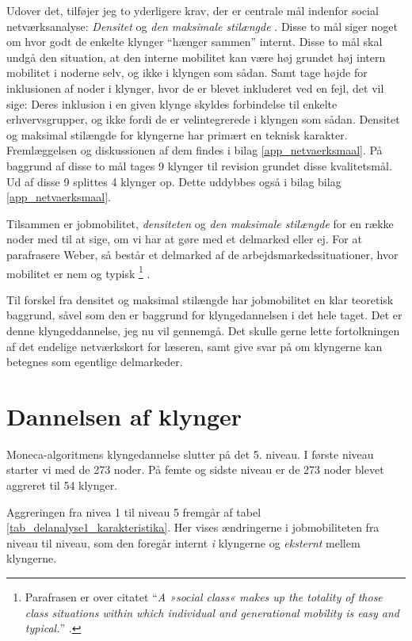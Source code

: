 Udover det, tilføjer jeg to yderligere krav, der er centrale mål indenfor social netværksanalyse: \emph{Densitet} og \emph{den maksimale stilængde} \parencite[68f]{Scott2000}. Disse to mål siger noget om hvor godt de enkelte klynger “hænger sammen” internt. Disse to mål skal undgå den situation, at den interne mobilitet kan være høj grundet høj intern mobilitet i noderne selv, og ikke i klyngen som sådan. Samt tage højde for inklusionen af noder i klynger, hvor de er blevet inkluderet ved en fejl, det vil sige: Deres inklusion i en given klynge skyldes forbindelse til enkelte erhvervsgrupper, og ikke fordi de er velintegrerede i klyngen som sådan. Densitet og maksimal stilængde for klyngerne har primært en teknisk karakter. Fremlæggelsen og diskussionen af dem findes i bilag \ref{app_netvaerksmaal}. På baggrund af disse to mål tages 9 klynger til revision grundet disse kvalitetsmål. Ud af disse 9 splittes 4 klynger op. Dette uddybbes også i bilag bilag \ref{app_netvaerksmaal}. 

Tilsammen er jobmobilitet, \emph{densiteten} og \emph{den maksimale stilængde} for en række noder med til at sige, om vi har at gøre med et delmarked eller ej. For at parafrasere Weber, så består et delmarked af de arbejdsmarkedssituationer, hvor mobilitet er nem og typisk 
%
\footnote{Parafrasen er over citatet “\emph{A »social class« makes up the totality of those class situations within which individual and generational mobility is easy and typical.}” \parencite[302]{Weber1978}.}%
%
\parencite[302]{Weber1978}. 

Til forskel fra densitet og maksimal stilængde har jobmobilitet en klar teoretisk baggrund, såvel som den er baggrund for klyngedannelsen i det hele taget. Det er denne klyngeddannelse, jeg nu vil gennemgå. Det skulle gerne lette fortolkningen af det endelige netværkskort for læseren, samt give svar på om klyngerne kan betegnes som egentlige delmarkeder. 

\section{Dannelsen af klynger \label{delanalyse1_segmenteringsprocessen}}

Moneca-algoritmens klyngedannelse slutter på det 5. niveau. I første niveau starter vi med de 273 noder. På femte og sidste niveau er de 273 noder blevet aggreret til 54 klynger.

Aggreringen fra nivea 1 til niveau 5 fremgår af tabel \ref{tab_delanalyse1_karakteristika}. Her vises ændringerne i jobmobiliteten fra niveau til niveau, som den foregår internt \emph{i} klyngerne og \emph{eksternt} mellem klyngerne.

